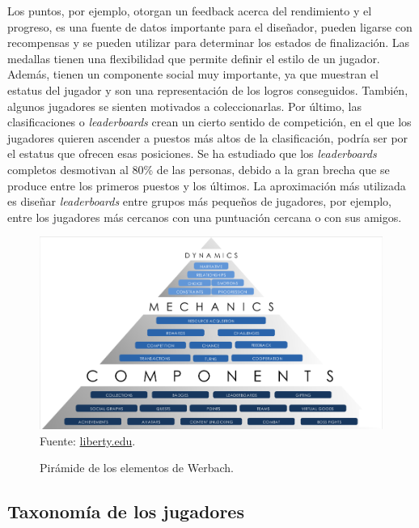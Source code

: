 Los puntos, por ejemplo, otorgan un feedback acerca del rendimiento y el progreso, es una fuente de datos importante para el diseñador, pueden ligarse con recompensas y se pueden utilizar para determinar los estados de finalización.
%
Las medallas tienen una flexibilidad que permite definir el estilo de un jugador. 
%
Además, tienen un componente social muy importante, ya que muestran el estatus del jugador y son una representación de los logros conseguidos. 
%
También, algunos jugadores se sienten motivados a coleccionarlas.
%
Por último, las clasificaciones o \textit{leaderboards} crean un cierto sentido de competición, en el que los jugadores quieren ascender a puestos más altos de la clasificación, podría ser por el estatus que ofrecen esas posiciones.
%
Se ha estudiado que los \textit{leaderboards} completos desmotivan al 80\% de las personas, debido a la gran brecha que se produce entre los primeros puestos y los últimos.
%
La aproximación más utilizada es diseñar \textit{leaderboards} entre grupos más pequeños de jugadores, por ejemplo, entre los jugadores más cercanos con una puntuación cercana o con sus amigos.



\begin{figure}[hbt]
\begin{center}
\caption{Pirámide de los elementos de Werbach.}
\label{fig::PiramydWerbach}
\includegraphics[scale=0.90]{img/Pyramid.png}
\vspace{-0.25cm}
\small{Fuente: \href{http://www.liberty.edu/academics/cafe/index.cfm?id=891255&blogpid=32579&pid=9720}{liberty.edu}.}
\end{center}
\end{figure}
\FloatBarrier



\subsection{Taxonomía de los jugadores}
\label{sec:taxonomy}

